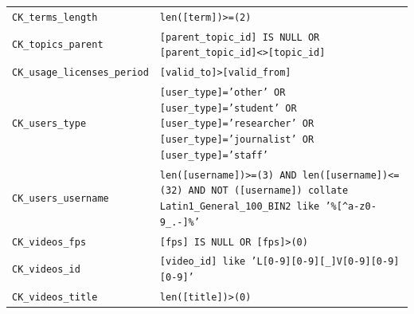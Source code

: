 \begin{longtable}{>{\raggedright\arraybackslash}p{}>{\raggedright\arraybackslash}p{}}
\texttt{CK\_terms\_length} & \texttt{len([term])>=(2)} \\
\texttt{CK\_topics\_parent} & \texttt{[parent\_topic\_id] IS NULL OR [parent\_topic\_id]<>[topic\_id]} \\
\texttt{CK\_usage\_licenses\_period} & \texttt{[valid\_to]>[valid\_from]} \\
\texttt{CK\_users\_type} & \texttt{[user\_type]='other' OR [user\_type]='student' OR [user\_type]='researcher' OR [user\_type]='journalist' OR [user\_type]='staff'} \\
\texttt{CK\_users\_username} & \texttt{len([username])>=(3) AND len([username])<=(32) AND NOT ([username]) collate Latin1\_General\_100\_BIN2 like '\%[\textasciicircum{}a-z0-9\_.-]\%'} \\
\texttt{CK\_videos\_fps} & \texttt{[fps] IS NULL OR [fps]>(0)} \\
\texttt{CK\_videos\_id} & \texttt{[video\_id] like 'L[0-9][0-9][\_]V[0-9][0-9][0-9]'} \\
\texttt{CK\_videos\_title} & \texttt{len([title])>(0)} \\
\end{longtable}
